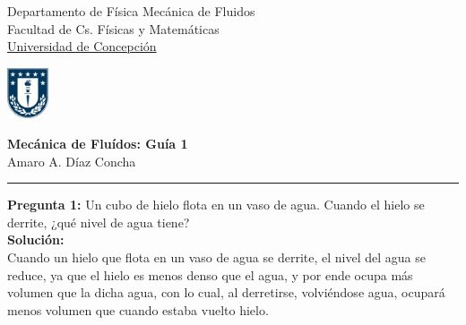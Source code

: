 \documentclass[11pt,letterpaper]{article}
\begin{document}

\usetikzlibrary{positioning}
\pagestyle{plain}
\begin{flushleft}
Departamento de Física \hfill Mecánica de Fluidos\\
Facultad de Cs. Físicas y Matemáticas\\
\underline{Universidad de Concepción}
\end{flushleft}

\begin{flushright}\vspace{-5mm}
\includegraphics[height=1.5cm]{escudo .jpg}
\end{flushright}
 
\begin{center}\vspace{-1cm} 
\textbf{\large Mecánica de Fluídos: Guía 1}\\   %
Amaro A. Díaz Concha\\                         %
\end{center}
\rule{\linewidth}{0.1mm}
\textbf{Pregunta 1:} Un cubo de hielo flota en un vaso de agua. Cuando el hielo se derrite, ¿qué nivel de agua tiene? \\
\textbf{Solución:} \\ 
Cuando un hielo que flota en un vaso de agua se derrite, el nivel del agua se reduce, ya que el hielo es menos denso que el agua, y por ende ocupa más volumen que la dicha agua, con lo cual, al derretirse, volviéndose agua, ocupará menos volumen que cuando estaba vuelto hielo.
 
\end{document}
